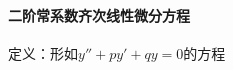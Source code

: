 \documentclass{article}
\begin{document}
\begin{flushleft}
	 \paragraph{二阶常系数齐次线性微分方程}
	 定义：形如$y''+py'+qy=0$的方程\\
	 
\end{flushleft}
\end{document}
